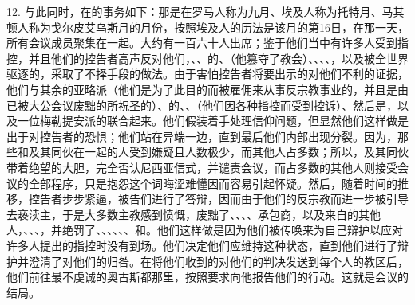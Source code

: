 12. 与此同时，在的事务如下：那是在罗马人称为九月、埃及人称为托特月、马其顿人称为戈尔皮艾乌斯月的月份，按照埃及人的历法是该月的第16日，在那一天，所有会议成员聚集在一起。大约有一百六十人出席；鉴于他们当中有许多人受到指控，并且他们的控告者高声反对他们，、、的、（他篡夺了教会）、、、、，以及被全世界驱逐的，采取了不择手段的做法。由于害怕控告者将要出示的对他们不利的证据，他们与其余的亚略派（他们是为了此目的而被雇佣来从事反宗教事业的，并且是由已被大公会议废黜的所祝圣的）、的、、（他们因各种指控而受到控诉）、然后是，以及一位梅勒提安派的联合起来。他们假装着手处理信仰问题，但显然他们这样做是出于对控告者的恐惧；他们站在异端一边，直到最后他们内部出现分裂。因为，那些和及其同伙在一起的人受到嫌疑且人数极少，而其他人占多数；所以，及其同伙带着绝望的大胆，完全否认尼西亚信式，并谴责会议，而占多数的其他人则接受会议的全部程序，只是抱怨这个词晦涩难懂因而容易引起怀疑。然后，随着时间的推移，控告者步步紧逼，被告们进行了答辩，因而由于他们的反宗教而进一步被引导去亵渎主，于是大多数主教感到愤慨，废黜了、、、、承包商，以及来自的其他人，、、、，并绝罚了、、、、、、和。他们这样做是因为他们被传唤来为自己辩护以应对许多人提出的指控时没有到场。他们决定他们应维持这种状态，直到他们进行了辩护并澄清了对他们的归咎。在将他们收到的对他们的判决发送到每个人的教区后，他们前往最不虔诚的奥古斯都那里，按照要求向他报告他们的行动。这就是会议的结局。\par

